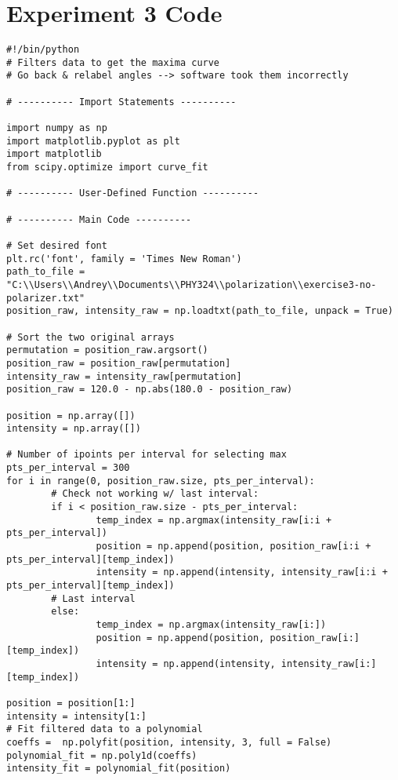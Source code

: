 \section*{Experiment 3 Code}
\begin{lstlisting}
#!/bin/python
# Filters data to get the maxima curve
# Go back & relabel angles --> software took them incorrectly

# ---------- Import Statements ----------

import numpy as np
import matplotlib.pyplot as plt
import matplotlib
from scipy.optimize import curve_fit

# ---------- User-Defined Function ----------

# ---------- Main Code ----------

# Set desired font
plt.rc('font', family = 'Times New Roman')
path_to_file = "C:\\Users\\Andrey\\Documents\\PHY324\\polarization\\exercise3-no-polarizer.txt"
position_raw, intensity_raw = np.loadtxt(path_to_file, unpack = True)

# Sort the two original arrays
permutation = position_raw.argsort()
position_raw = position_raw[permutation]
intensity_raw = intensity_raw[permutation]
position_raw = 120.0 - np.abs(180.0 - position_raw)

position = np.array([])
intensity = np.array([])

# Number of ipoints per interval for selecting max
pts_per_interval = 300
for i in range(0, position_raw.size, pts_per_interval):
        # Check not working w/ last interval:
        if i < position_raw.size - pts_per_interval:
                temp_index = np.argmax(intensity_raw[i:i + pts_per_interval])
                position = np.append(position, position_raw[i:i + pts_per_interval][temp_index])
                intensity = np.append(intensity, intensity_raw[i:i + pts_per_interval][temp_index])
        # Last interval
        else:
                temp_index = np.argmax(intensity_raw[i:])
                position = np.append(position, position_raw[i:][temp_index])
                intensity = np.append(intensity, intensity_raw[i:][temp_index])

position = position[1:]
intensity = intensity[1:]
# Fit filtered data to a polynomial
coeffs =  np.polyfit(position, intensity, 3, full = False)
polynomial_fit = np.poly1d(coeffs)
intensity_fit = polynomial_fit(position)


\end{lstlisting}
